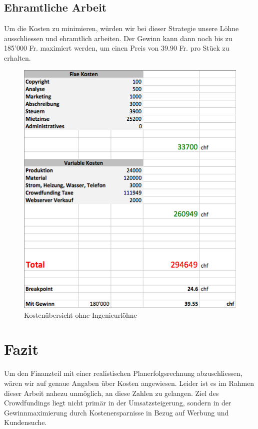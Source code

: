 \subsection{Ehramtliche Arbeit}
Um die Kosten zu minimieren, w\"urden wir bei dieser Strategie unsere L\"ohne ausschliessen und ehramtlich arbeiten.
Der Gewinn kann dann noch bis zu 185'000 Fr. maximiert werden, um einen Preis von 39.90 Fr. pro St\"uck zu erhalten.
\begin{figure}[H]
	\centering
		\includegraphics[scale=0.6]{bilder/ehramtlich.png}
	\caption{Kosten\"ubersicht ohne Ingenieurl\"ohne}
	\label{fig:ehramtlich}
\end{figure}



\section{Fazit}
Um den Finanzteil mit einer realistischen Planerfolgsrechnung abzuschliessen, w\"aren wir auf genaue Angaben \"uber Kosten angewiesen. Leider ist es im Rahmen dieser Arbeit nahezu unm\"oglich, an diese Zahlen zu gelangen. Ziel des Crowdfundings liegt nicht prim\"ar in der Umsatzsteigerung, sondern in der Gewinnmaximierung durch Kostenersparnisse in Bezug auf Werbung und Kundensuche. 